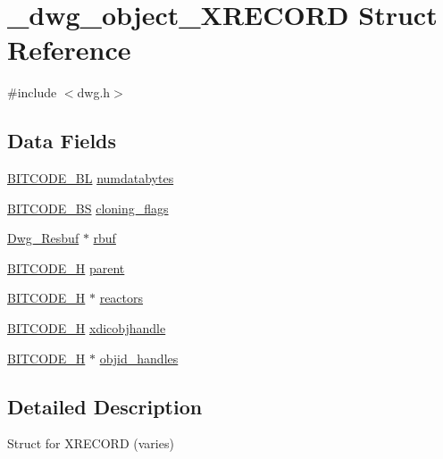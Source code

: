 \hypertarget{struct__dwg__object__XRECORD}{\section{\-\_\-dwg\-\_\-object\-\_\-\-X\-R\-E\-C\-O\-R\-D \-Struct \-Reference}
\label{struct__dwg__object__XRECORD}
}


{\ttfamily \#include $<$dwg.\-h$>$}

\subsection*{\-Data \-Fields}
\begin{DoxyCompactItemize}
\item 
\hyperlink{dwg_8h_aebd5f127038868cbabc3d55d91da776c}{\-B\-I\-T\-C\-O\-D\-E\-\_\-\-B\-L} \hyperlink{struct__dwg__object__XRECORD_a1e5f11284f4b6fd462d140513eb2a308}{numdatabytes}
\item 
\hyperlink{dwg_8h_a94297606fbd4a4ff97e8add284af0809}{\-B\-I\-T\-C\-O\-D\-E\-\_\-\-B\-S} \hyperlink{struct__dwg__object__XRECORD_a97f5fc155edf29247752622b6577ef0a}{cloning\-\_\-flags}
\item 
\hyperlink{dwg_8h_a1fa2b1686e82246f6096fa855c4a961b}{\-Dwg\-\_\-\-Resbuf} $\ast$ \hyperlink{struct__dwg__object__XRECORD_ae4e365922cfd903c2fef6ccfc53b392c}{rbuf}
\item 
\hyperlink{dwg_8h_a7c700e94e047a97ba8c24bdfe4029dc3}{\-B\-I\-T\-C\-O\-D\-E\-\_\-\-H} \hyperlink{struct__dwg__object__XRECORD_a64fd5ee8127c8755949fcfdd85a8f8af}{parent}
\item 
\hyperlink{dwg_8h_a7c700e94e047a97ba8c24bdfe4029dc3}{\-B\-I\-T\-C\-O\-D\-E\-\_\-\-H} $\ast$ \hyperlink{struct__dwg__object__XRECORD_a913efeae1ca628d7a4ff1cb31f3aebbd}{reactors}
\item 
\hyperlink{dwg_8h_a7c700e94e047a97ba8c24bdfe4029dc3}{\-B\-I\-T\-C\-O\-D\-E\-\_\-\-H} \hyperlink{struct__dwg__object__XRECORD_a92b0370480cc86ef1a384a49452620b1}{xdicobjhandle}
\item 
\hyperlink{dwg_8h_a7c700e94e047a97ba8c24bdfe4029dc3}{\-B\-I\-T\-C\-O\-D\-E\-\_\-\-H} $\ast$ \hyperlink{struct__dwg__object__XRECORD_a1dbac551dc05ebfdd2ebc4b872a11b3d}{objid\-\_\-handles}
\end{DoxyCompactItemize}


\subsection{\-Detailed \-Description}
\-Struct for \-X\-R\-E\-C\-O\-R\-D (varies) 

